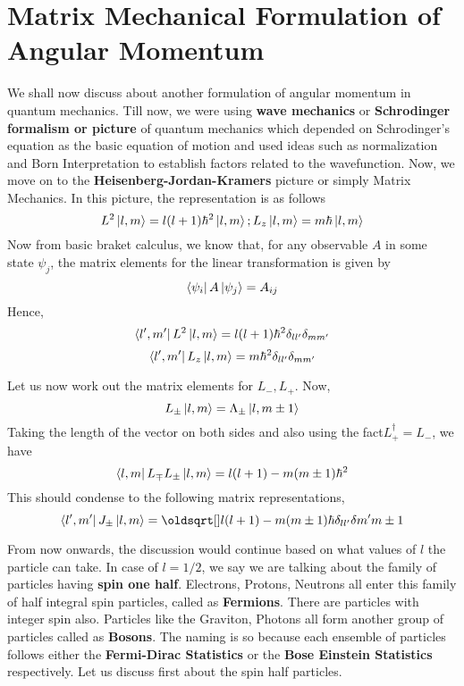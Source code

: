\documentclass[12pt]{article}
\begin{document}
\section{Matrix Mechanical Formulation of Angular Momentum}
We shall now discuss about another formulation of angular momentum in quantum mechanics. Till now, we were using \textbf{wave mechanics} or \textbf{Schrodinger formalism or picture} of quantum mechanics which depended on Schrodinger's equation as the basic equation of motion and used ideas such as normalization and Born Interpretation to establish factors related to the wavefunction. Now, we move on to the \textbf{Heisenberg-Jordan-Kramers} picture or simply Matrix Mechanics. In this picture, the representation is as follows
$$L^2\Ket{l,m} = l(l+1)\hbar^2\Ket{l,m};  L_z\Ket{l,m} = m\hbar\Ket{l,m}$$
Now from basic braket calculus, we know that, for any observable $A$ in some state $\psi_j$, the matrix elements for the linear transformation is given by
$$\Bra{\psi_i}A\Ket{\psi_j} = A_{ij}$$ Hence,
$$\Bra{l',m'}L^2\Ket{l,m} = l(l+1)\hbar^2\delta_{ll'}\delta_{mm'}$$
$$\Bra{l',m'}L_z\Ket{l,m} = m\hbar^2\delta_{ll'}\delta_{mm'}$$

Let us now work out the matrix elements for $L_-,L_+$. Now, $$L_{\pm}\Ket{l,m} = \Lambda_{\pm}\Ket{l, m\pm1}$$ Taking the length of the vector on both sides and also using the fact$ L_+^{\dag} = L_-$, we have $$\Bra{l,m}L_{\mp}L_{\pm}\Ket{l,m} = {l(l+1) - m(m\pm1)}\hbar^2$$
This should condense to the following matrix representations,
$$\Bra{l',m'}J_{\pm}\Ket{l,m} = \sqrt{l(l+1)-m(m\pm1)}\hbar\delta_{ll'}\delta{m'm\pm1}$$

From now onwards, the discussion would continue based on what values of $l$ the particle can take. In case of $l = 1/2$, we say we are talking about the family of particles having \textbf{spin one half}. Electrons, Protons, Neutrons all enter this family of half integral spin particles, called as \textbf{Fermions}. There are particles with integer spin also. Particles like the Graviton, Photons all form another group of particles called as \textbf{Bosons}. The naming is so because each ensemble of particles follows either the \textbf{Fermi-Dirac Statistics} or the \textbf{Bose Einstein Statistics} respectively. Let us discuss first about the spin half particles.
\end{document}
